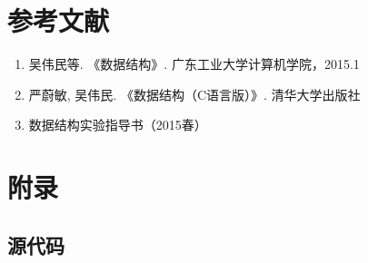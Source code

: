 \documentclass[12pt,a4paper]{article}
\begin{document}
\section{参考文献}
\begin{enumerate}
\item 吴伟民等. 《数据结构》. 广东工业大学计算机学院，2015.1
\item 严蔚敏, 吴伟民. 《数据结构（C语言版）》. 清华大学出版社
\item 数据结构实验指导书（2015春）
\end{enumerate}

\section{附录}
\subsection{源代码}
\end{document}
